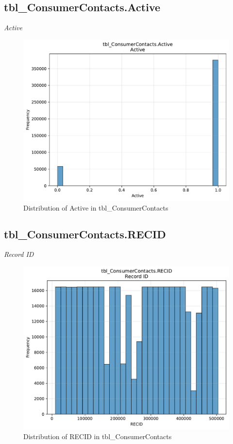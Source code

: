 \subsection{tbl\_ConsumerContacts.Active}
\textit{Active}

\begin{figure}[htbp]
\centering
\includegraphics[width=\textwidth]{figures/dbo_tbl_ConsumerContacts_Active.pdf}
\caption{Distribution of Active in tbl\_ConsumerContacts}
\end{figure}\newpage

\subsection{tbl\_ConsumerContacts.RECID}
\textit{Record ID}

\begin{figure}[htbp]
\centering
\includegraphics[width=\textwidth]{figures/dbo_tbl_ConsumerContacts_RECID.pdf}
\caption{Distribution of RECID in tbl\_ConsumerContacts}
\end{figure}\newpage

